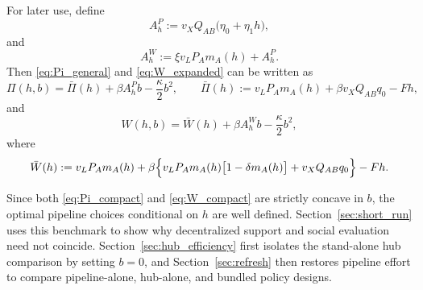 For later use, define
\begin{equation}
A_h^P
:=
v_X Q_{AB}\bigl(\eta_0+\eta_1 h\bigr),
\label{eq:Ah_private}
\end{equation}
and
\begin{equation}
A_h^W
:=
\xi v_L P_A m_A(h)+A_h^P.
\label{eq:Ah_social}
\end{equation}
Then \eqref{eq:Pi_general} and \eqref{eq:W_expanded} can be written as
\begin{equation}
\Pi(h,b)
=
\bar\Pi(h)+\beta A_h^P b-\frac{\kappa}{2}b^2,
\qquad
\bar\Pi(h):=v_L P_A m_A(h)+\beta v_X Q_{AB}q_0-Fh,
\label{eq:Pi_compact}
\end{equation}
and
\begin{equation}
W(h,b)
=
\bar W(h)+\beta A_h^W b-\frac{\kappa}{2}b^2,
\label{eq:W_compact}
\end{equation}
where
\begin{equation}
\bar W(h)
:=
v_L P_A m_A(h)
+
\beta\Bigl\{
v_L P_A m_A(h)\bigl[1-\delta m_A(h)\bigr]
+
v_X Q_{AB}q_0
\Bigr\}
-Fh.
\label{eq:Wbar}
\end{equation}

Since both \eqref{eq:Pi_compact} and \eqref{eq:W_compact} are strictly concave in $b$, the optimal pipeline choices conditional on $h$ are well defined. Section~\ref{sec:short_run} uses this benchmark to show why decentralized support and social evaluation need not coincide. Section~\ref{sec:hub_efficiency} first isolates the stand-alone hub comparison by setting $b=0$, and Section~\ref{sec:refresh} then restores pipeline effort to compare pipeline-alone, hub-alone, and bundled policy designs.
